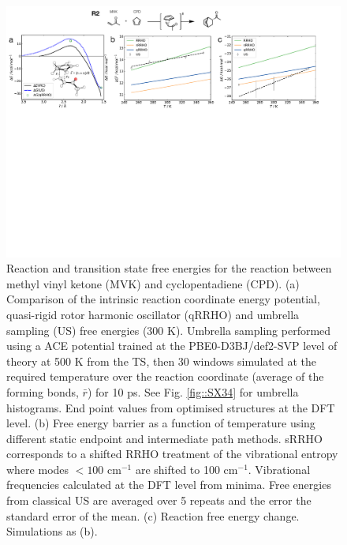 \documentclass[twoside,twocolumn,9pt]{article}
\begin{document}
\begin{figure}[b]
	\centering
	\includegraphics[width=\textwidth]{figX3}
	\caption{Reaction and transition state free energies for the reaction between methyl vinyl ketone (MVK) and cyclopentadiene (CPD). (a) Comparison of the intrinsic reaction coordinate energy potential, quasi-rigid rotor harmonic oscillator (qRRHO) and umbrella sampling (US) free energies (300 K). Umbrella sampling performed using a ACE potential trained at the PBE0-D3BJ/def2-SVP level of theory at 500 K from the TS, then 30 windows simulated at the required temperature over the reaction coordinate (average of the forming bonds, $\bar{r}$) for 10 ps. See Fig. \ref{fig::SX34} for umbrella histograms. End point values from optimised structures at the DFT level. (b) Free energy barrier as a function of temperature using different static endpoint and intermediate path methods. sRRHO corresponds to a shifted RRHO treatment of the vibrational entropy where modes $<100$ cm$^{-1}$ are shifted to 100 cm$^{-1}$. Vibrational frequencies calculated at the DFT level from minima. Free energies from classical US are averaged over 5 repeats and the error the standard error of the mean. (c) Reaction free energy change. Simulations as (b).}
	\label{fig::X3}
\end{figure}
\end{document}
